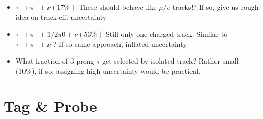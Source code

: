 \documentclass{beamer}
\begin{document}
\begin{frame}
\begin{columns}
\begin{column}{0.35\textwidth}
 \end{column}
\end{columns}
\begin{itemize}
 \item $\tau\rightarrow\pi^{-} + \nu (17\%)$ These should behave like $\mu/e$ tracks!? If so, give us rough idea on track eff. uncertainty
   \item $\tau\rightarrow\pi^{-} + 1/2\pi0 + \nu (53\%)$ Still only one charged track. Similar to $\tau\rightarrow\pi^{-} + \nu$ ? If so same approach, inflated uncertainty.
   \item What fraction of 3 prong $\tau$ get selected by isolated track? Rather small (10\%), if so, assigning high uncertainty would be practical.
\end{itemize}
\end{frame}



\section{Tag \& Probe}
\end{document}
